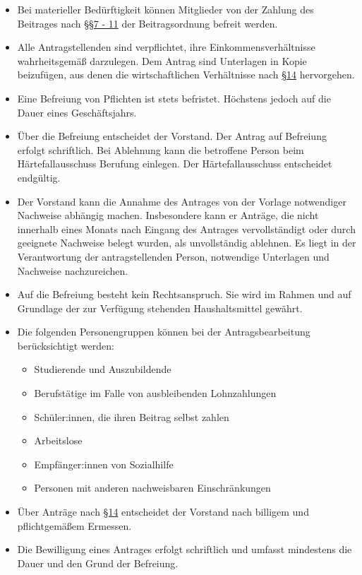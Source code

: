\documentclass[12pt,paper=a4,ngerman]{report}
\begin{document}
\begin{itemize}
    \item Bei materieller Bedürftigkeit können Mitglieder von der Zahlung des Beitrages nach \hyperref[par-7]{§§7 - 11} der Beitragsordnung befreit werden.
    \item Alle Antragstellenden sind verpflichtet, ihre Einkommensverhältnisse wahrheitsgemäß darzulegen. Dem Antrag sind Unterlagen in Kopie beizufügen, aus denen die wirtschaftlichen Verhältnisse nach \hyperref[par-14]{§14} hervorgehen.
    \item Eine Befreiung von Pflichten ist stets befristet. Höchstens jedoch auf die Dauer eines Geschäftsjahrs.
    \item Über die Befreiung entscheidet der Vorstand. Der Antrag auf Befreiung erfolgt schriftlich. Bei Ablehnung kann die betroffene Person beim Härtefallausschuss Berufung einlegen. Der Härtefallausschuss entscheidet endgültig.
    \item Der Vorstand kann die Annahme des Antrages von der Vorlage notwendiger Nachweise abhängig machen. Insbesondere kann er Anträge, die nicht innerhalb eines Monats nach Eingang des Antrages vervollständigt oder durch geeignete Nachweise belegt wurden, als unvollständig ablehnen. Es liegt in der Verantwortung der antragstellenden Person, notwendige Unterlagen und Nachweise nachzureichen.
    \item Auf die Befreiung besteht kein Rechtsanspruch. Sie wird im Rahmen und auf Grundlage der zur Verfügung stehenden Haushaltsmittel gewährt.
    \item Die folgenden Personengruppen können bei der Antragsbearbeitung berücksichtigt werden:
    \begin{itemize}
        \item Studierende und Auszubildende
        \item Berufstätige im Falle von ausbleibenden Lohnzahlungen
        \item Schüler:innen, die ihren Beitrag selbst zahlen
        \item Arbeitslose
        \item Empfänger:innen von Sozialhilfe
        \item Personen mit anderen nachweisbaren Einschränkungen
    \end{itemize}
    \item Über Anträge nach \hyperref[par-14]{§14} entscheidet der Vorstand nach billigem und pflichtgemäßem Ermessen.
    \item Die Bewilligung eines Antrages erfolgt schriftlich und umfasst mindestens die Dauer und den Grund der Befreiung.

\end{itemize}
\end{document}
